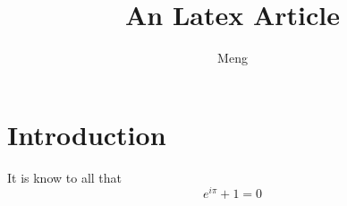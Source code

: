 \documentclass[12pt]{article}
\author{Meng}
\title{An Latex Article}
\begin{document}
    \maketitle
    \section{Introduction}
    It is know to all that
    $$
    e^{i\pi} + 1 = 0
    $$
\end{document}

